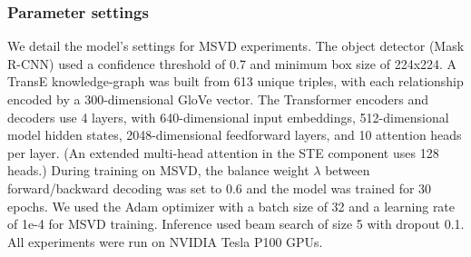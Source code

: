 \subsubsection{Parameter settings}

We detail the model's settings for MSVD experiments. The object detector (Mask R-CNN) used a confidence threshold of 0.7 and minimum box size of 224x224. A TransE knowledge-graph was built from 613 unique triples, with each relationship encoded by a 300-dimensional GloVe vector. The Transformer encoders and decoders use 4 layers, with 640-dimensional input embeddings, 512-dimensional model hidden states, 2048-dimensional feedforward layers, and 10 attention heads per layer. (An extended multi-head attention in the STE component uses 128 heads.) During training on MSVD, the balance weight $\lambda$ between forward/backward decoding was set to 0.6 and the model was trained for 30 epochs. We used the Adam optimizer with a batch size of 32 and a learning rate of 1e-4 for MSVD training. Inference used beam search of size 5 with dropout 0.1. All experiments were run on NVIDIA Tesla P100 GPUs.
